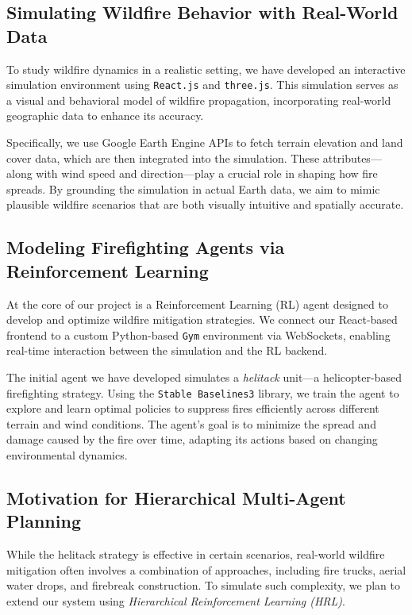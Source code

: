 \documentclass[conference]{IEEEtran}
\begin{document}
\subsection{Simulating Wildfire Behavior with Real-World Data}
To study wildfire dynamics in a realistic setting, we have developed an interactive simulation environment using \texttt{React.js} and \texttt{three.js}. This simulation serves as a visual and behavioral model of wildfire propagation, incorporating real-world geographic data to enhance its accuracy.

\noindent
Specifically, we use Google Earth Engine APIs to fetch terrain elevation and land cover data, which are then integrated into the simulation. These attributes—along with wind speed and direction—play a crucial role in shaping how fire spreads. By grounding the simulation in actual Earth data, we aim to mimic plausible wildfire scenarios that are both visually intuitive and spatially accurate.

\subsection{Modeling Firefighting Agents via Reinforcement Learning}
At the core of our project is a Reinforcement Learning (RL) agent designed to develop and optimize wildfire mitigation strategies. We connect our React-based frontend to a custom Python-based \texttt{Gym} environment via WebSockets, enabling real-time interaction between the simulation and the RL backend.

\noindent
The initial agent we have developed simulates a \textit{helitack} unit—a helicopter-based firefighting strategy. Using the \texttt{Stable Baselines3} library, we train the agent to explore and learn optimal policies to suppress fires efficiently across different terrain and wind conditions. The agent's goal is to minimize the spread and damage caused by the fire over time, adapting its actions based on changing environmental dynamics.

\subsection{Motivation for Hierarchical Multi-Agent Planning}
While the helitack strategy is effective in certain scenarios, real-world wildfire mitigation often involves a combination of approaches, including fire trucks, aerial water drops, and firebreak construction. To simulate such complexity, we plan to extend our system using \textit{Hierarchical Reinforcement Learning (HRL)}.
\end{document}

